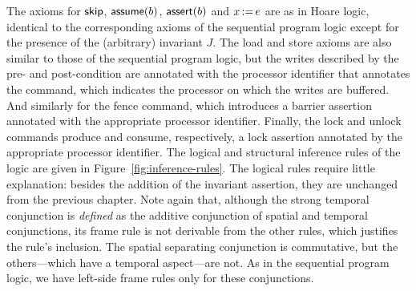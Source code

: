 \documentclass[11pt]{report}         %
\begin{document}
The axioms for $\operatorname{\mathsf{skip}}$, $\operatorname{\mathsf{assume}}(b)$, $\operatorname{\mathsf{assert}}(b)$ and $x \operatorname{:\!=} e$ are as in Hoare logic, identical to the corresponding axioms of the sequential program logic except for the presence of the (arbitrary) invariant $J$. The load and store axioms are also similar to those of the sequential program logic, but the writes described by the pre- and post-condition are annotated with the processor identifier that annotates the command, which indicates the processor on which the writes are buffered. And similarly for the fence command, which introduces a barrier assertion annotated with the appropriate processor identifier. Finally, the lock and unlock commands produce and consume, respectively, a lock assertion annotated by the appropriate processor identifier. 
The logical and structural inference rules of the logic are given in Figure~\ref{fig:inference-rules}. The logical rules require little explanation: besides the addition of the invariant assertion, they are unchanged from the previous chapter. Note again that, although the strong temporal conjunction is \emph{defined} as the additive conjunction of spatial and temporal conjunctions, its frame rule is not derivable from the other rules, which justifies the rule's inclusion. The spatial separating conjunction is commutative, but the others---which have a temporal aspect---are not. As in the sequential program logic, we have left-side frame rules only for these conjunctions. 
\end{document}
